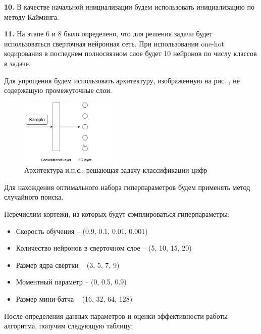 \textbf{10.} В качестве начальной инициализации будем использовать инициализацию по методу Кайминга.


\textbf{11.} На этапе 6 и 8 было определено, что для решения задачи будет использоваться сверточная нейронная сеть. При использовании one-hot кодирования в последнем полносвязном слое будет 10 нейронов по числу классов в задаче.

Для упрощения будем использовать архитектуру, изображенную на рис. , не содержащую промежуточные слои.

\begin{figure}[h]
	\centering
	\includegraphics[width=0.4\textwidth]{author/part3/figures/model.png}
	\caption{Архитектура и.н.с., решающая задачу классификации цифр}
	\label{fig:model}
\end{figure}

Для нахождения оптимального набора гиперпараметров будем применять метод случайного поиска.

Перечислим кортежи, из которых будут сэмплироваться гиперпараметры:
\begin{itemize}
	\item Скорость обучения -- (0.9, 0.1, 0.01, 0.001)
	\item Количество нейронов в сверточном слое -- (5, 10, 15, 20)
	\item Размер ядра свертки -- (3, 5, 7, 9)
	\item Моментный параметр -- (0, 0.5, 0.9)
	\item Размер мини-батча -- (16, 32, 64, 128)
\end{itemize}

После определения данных параметров и оценки эффективности работы алгоритма, получим следующую таблицу:

